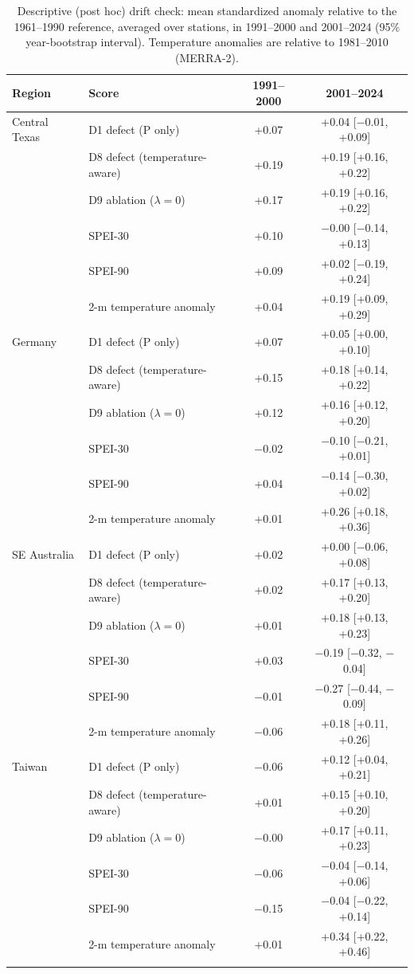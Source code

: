 \begin{table}[h]
\caption{Descriptive (post hoc) drift check: mean standardized anomaly relative to the 1961--1990
reference, averaged over stations, in 1991--2000 and 2001--2024 (95\% year-bootstrap interval).
Temperature anomalies are relative to 1981--2010 (MERRA-2).}\label{tab:drift}
\footnotesize\setlength{\tabcolsep}{4pt}
\begin{tabular*}{\textwidth}{@{\extracolsep\fill}llcc}
\toprule
Region & Score & 1991--2000 & 2001--2024\\
\midrule
Central Texas & D1 defect (P only) & +0.07 & +0.04 [$-$0.01, +0.09] \\
 & D8 defect (temperature-aware) & +0.19 & +0.19 [+0.16, +0.22] \\
 & D9 ablation ($\lambda=0$) & +0.17 & +0.19 [+0.16, +0.22] \\
 & SPEI-30 & +0.10 & $-$0.00 [$-$0.14, +0.13] \\
 & SPEI-90 & +0.09 & +0.02 [$-$0.19, +0.24] \\
 & 2-m temperature anomaly & +0.04 & +0.19 [+0.09, +0.29] \\
\midrule
Germany & D1 defect (P only) & +0.07 & +0.05 [+0.00, +0.10] \\
 & D8 defect (temperature-aware) & +0.15 & +0.18 [+0.14, +0.22] \\
 & D9 ablation ($\lambda=0$) & +0.12 & +0.16 [+0.12, +0.20] \\
 & SPEI-30 & $-$0.02 & $-$0.10 [$-$0.21, +0.01] \\
 & SPEI-90 & +0.04 & $-$0.14 [$-$0.30, +0.02] \\
 & 2-m temperature anomaly & +0.01 & +0.26 [+0.18, +0.36] \\
\midrule
SE Australia & D1 defect (P only) & +0.02 & +0.00 [$-$0.06, +0.08] \\
 & D8 defect (temperature-aware) & +0.02 & +0.17 [+0.13, +0.20] \\
 & D9 ablation ($\lambda=0$) & +0.01 & +0.18 [+0.13, +0.23] \\
 & SPEI-30 & +0.03 & $-$0.19 [$-$0.32, $-$0.04] \\
 & SPEI-90 & $-$0.01 & $-$0.27 [$-$0.44, $-$0.09] \\
 & 2-m temperature anomaly & $-$0.06 & +0.18 [+0.11, +0.26] \\
\midrule
Taiwan & D1 defect (P only) & $-$0.06 & +0.12 [+0.04, +0.21] \\
 & D8 defect (temperature-aware) & +0.01 & +0.15 [+0.10, +0.20] \\
 & D9 ablation ($\lambda=0$) & $-$0.00 & +0.17 [+0.11, +0.23] \\
 & SPEI-30 & $-$0.06 & $-$0.04 [$-$0.14, +0.06] \\
 & SPEI-90 & $-$0.15 & $-$0.04 [$-$0.22, +0.14] \\
 & 2-m temperature anomaly & +0.01 & +0.34 [+0.22, +0.46] \\
\botrule
\end{tabular*}
\end{table}
